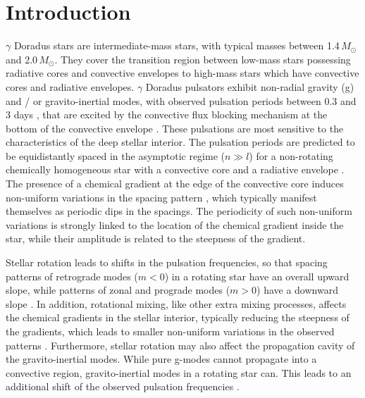 \documentclass{aa}
\def\Msun{$M_{\odot}$}
\begin{document}
\section{Introduction}
$\gamma$ Doradus stars are intermediate-mass stars, with typical masses between 1.4\,\Msun and 2.0\,\Msun. They cover the transition region between low-mass stars possessing radiative cores and convective envelopes to high-mass stars which have convective cores and radiative envelopes. $\gamma$ Doradus pulsators exhibit non-radial gravity (g) and / or gravito-inertial modes, with observed pulsation periods between 0.3 and 3 days \citep{kaye1999}, that are excited by the convective flux blocking mechanism at the bottom of the convective envelope \citep{guzik2000,dupret2005aa}. These pulsations are most sensitive to the characteristics of the deep stellar interior. The pulsation periods are predicted to be equidistantly spaced in the asymptotic regime ($n\gg l$) for a non-rotating chemically homogeneous star with a convective core and a radiative envelope \citep{tassoul1980}. The presence of a chemical gradient at the edge of the convective core induces non-uniform variations in the spacing pattern \citep{miglio2008}, which typically manifest themselves as periodic dips in the spacings. The periodicity of such non-uniform variations is strongly linked to the location of the chemical gradient inside the star, while their amplitude is related to the steepness of the gradient. 

Stellar rotation leads to shifts in the pulsation frequencies, so that spacing patterns of retrograde modes ($m < 0$) in a rotating star have an overall upward slope, while patterns of zonal and prograde modes ($m > 0$) have a downward slope \citep{bouabid2013}. In addition, rotational mixing, like other extra mixing processes, affects the chemical gradients in the stellar interior, typically reducing the steepness of the gradients, which leads to smaller non-uniform variations in the observed patterns \citep{bouabid2013}. Furthermore, stellar rotation may also affect the propagation cavity of the gravito-inertial modes. While pure g-modes cannot propagate into a convective region, gravito-inertial modes in a rotating star can. This leads to an additional shift of the observed pulsation frequencies \citep{prat2017}.
\end{document}

